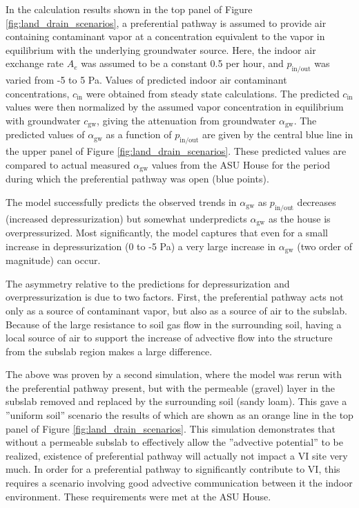 In the calculation results shown in the top panel of Figure \ref{fig:land_drain_scenarios}, a preferential pathway is assumed to provide air containing contaminant vapor at a concentration equivalent to the vapor in equilibrium with the underlying groundwater source.
Here, the indoor air exchange rate $A_e$ was assumed to be a constant 0.5 per hour, and $p_\mathrm{in/out}$ was varied from -5 to 5 Pa.
Values of predicted indoor air contaminant concentrations, $c_\mathrm{in}$ were obtained from steady state calculations.
The predicted $c_\mathrm{in}$ values were then normalized by the assumed vapor concentration in equilibrium with groundwater $c_\mathrm{gw}$, giving the attenuation from groundwater $\alpha_\mathrm{gw}$.
The predicted values of $\alpha_\mathrm{gw}$ as a function of $p_\mathrm{in/out}$ are given by the central blue line in the upper panel of Figure \ref{fig:land_drain_scenarios}.
These predicted values are compared to actual measured $\alpha_\mathrm{gw}$ values from the ASU House for the period during which the preferential pathway was open (blue points).\par

The model successfully predicts the observed trends in $\alpha_\mathrm{gw}$ as $p_\mathrm{in/out}$ decreases (increased depressurization) but somewhat underpredicts $\alpha_\mathrm{gw}$ as the house is overpressurized.
Most significantly, the model captures that even for a small increase in depressurization (0 to -5 Pa) a very large increase in $\alpha_\mathrm{gw}$ (two order of magnitude) can occur.\par

The asymmetry relative to the predictions for depressurization and overpressurization is due to two factors.
First, the preferential pathway acts not only as a source of contaminant vapor, but also  as a source of air to the subslab.
Because of the large resistance to soil gas flow in the surrounding soil, having a local source of air to support the increase of advective flow into the structure from the subslab region makes a large difference.\par

The above was proven by a second simulation, where the model was rerun with the preferential pathway present, but with the permeable (gravel) layer in the subslab removed and replaced by the surrounding soil (sandy loam).
This gave a ”uniform soil” scenario the results of which are shown as an orange line in the top panel of Figure \ref{fig:land_drain_scenarios}.
This simulation demonstrates that without a permeable subslab to effectively allow the ”advective potential” to be realized, existence of preferential pathway will actually not impact a VI site very much.
In order for a preferential pathway to significantly contribute to VI, this requires a scenario involving good advective communication between it the indoor environment.
These requirements were met at the ASU House.\par


